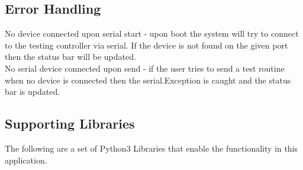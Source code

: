 \documentclass[11pt,fleqn]{book} %
\begin{document}
\subsection{Error Handling}

No device connected upon serial start - upon boot the system will try to connect to the testing controller via serial. If the device is not found on the given port then the status bar will be updated.\\

No serial device connected upon send - if the user tries to send a test routine when no device is connected then the serial.Exception is caught and the status bar is updated.

\subsection{Supporting Libraries}

The following are a set of Python3 Libraries that enable the functionality in this application.
\end{document}
